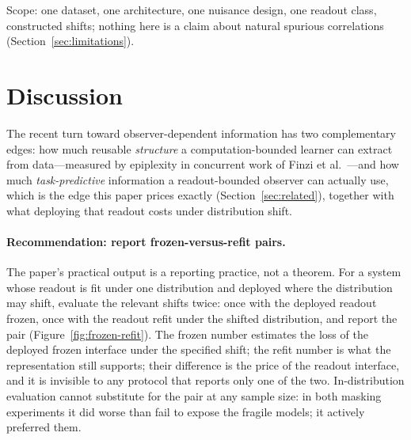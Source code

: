 \documentclass[twocolumn,10pt]{article}
\theoremstyle{definition}
\theoremstyle{remark}
\begin{document}
Scope: one dataset, one architecture, one nuisance design, one
readout class, constructed shifts; nothing here is a claim about
natural spurious correlations (Section~\ref{sec:limitations}).

\section{Discussion}
\label{sec:discussion}

The recent turn toward observer-dependent information has two
complementary edges: how much reusable \emph{structure} a
computation-bounded learner can extract from data---measured by
epiplexity in concurrent work of Finzi et al.~\cite{finziepiplexity}---and
how much \emph{task-predictive} information a readout-bounded observer
can actually use, which is the edge this paper prices exactly
(Section~\ref{sec:related}), together with what deploying that readout
costs under distribution shift.

\paragraph{Recommendation: report frozen-versus-refit pairs.} The
paper's practical output is a reporting practice, not a theorem. For a
system whose readout is fit under one distribution and deployed where
the distribution may shift, evaluate the relevant shifts twice: once
with the deployed readout frozen, once with the readout refit under
the shifted distribution, and report the pair
(Figure~\ref{fig:frozen-refit}). The frozen number estimates the loss
of the deployed frozen interface under the specified shift; the refit
number is what the representation still supports; their difference is the price of the
readout interface, and it is invisible to any protocol that reports
only one of the two. In-distribution evaluation cannot substitute for
the pair at any sample size: in both masking experiments it did
worse than fail to expose the fragile models; it actively preferred
them.
\end{document}
